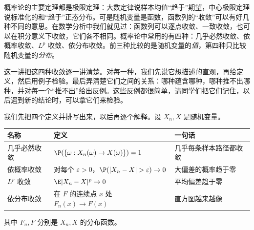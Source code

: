 \label{lec:convergence}

概率论的主要定理都是极限定理：大数定律说样本均值“趋于”期望，中心极限定理说标准化的和“趋于”正态分布。可是随机变量是函数，函数列的“收敛”可以有好几种不同的意思。在数学分析中我们就见过：函数列可以逐点收敛、一致收敛，也可以在积分意义下收敛，它们各不相同。概率论中常用的有四种：几乎必然收敛、依概率收敛、$L^p$ 收敛、依分布收敛。前三种比较的是随机变量的\emph{值}，第四种只比较随机变量的\emph{分布}。

这一讲把这四种收敛逐一讲清楚。对每一种，我们先说它想描述的直观，再给定义，然后用例子检验。最后弄清楚它们之间的关系：哪种蕴含哪种，哪种推不出哪种，并对每一个“推不出”给出反例。这些反例都很简单，请同学们把它们记住，以后遇到新的结论时，可以拿它们来检验。

我们先把四个定义并排写出来，以后再逐个解释。设 $X_n,X$ 是随机变量。
\begin{center}
\begin{tabular}{lll}
\toprule
名称 & 定义 & 一句话\\
\midrule
几乎必然收敛 & $\P(\{\omega:X_n(\omega)\to X(\omega)\})=1$ & 几乎每条样本路径都收敛\\
依概率收敛 & 对每个 $\varepsilon>0$，$\P(\abs{X_n-X}>\varepsilon)\to0$ & 大偏差的概率趋于零\\
$L^p$ 收敛 & $\E\abs{X_n-X}^p\to0$ & 平均偏差趋于零\\
依分布收敛 & 在 $F$ 的连续点 $x$ 处 $F_n(x)\to F(x)$ & 直方图越来越像\\
\bottomrule
\end{tabular}
\end{center}
其中 $F_n,F$ 分别是 $X_n,X$ 的分布函数。



